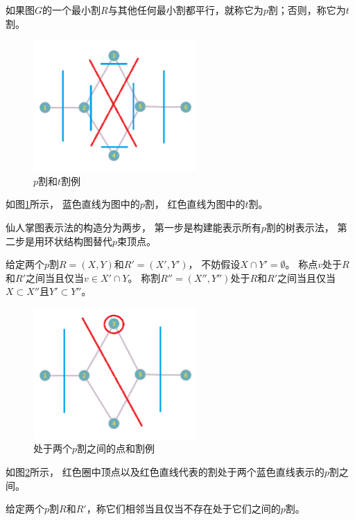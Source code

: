\begin{definition}[$p$割与$t$割]
  如果图$G$的一个最小割$R$与其他任何最小割都平行，就称它为$p$割；否则，称它为$t$割。
\end{definition}
\begin{figure}[htb]
  \centering
    \includegraphics[height=5cm]{figures/graph008.png}
  \caption{$p$割和$t$割例}
  \label{ptcut}
\end{figure}
如图\ref{ptcut}所示，
蓝色直线为图中的$p$割，
红色直线为图中的$t$割。

仙人掌图表示法的构造分为两步，
第一步是构建能表示所有$p$割的树表示法，
第二步是用环状结构图替代$p$束顶点。

\begin{definition}
  给定两个$p$割$R=(X,Y)$和$R'=(X',Y')$，
  不妨假设$X\cap Y'=\emptyset$。
  称点$v$处于$R$和$R'$之间当且仅当$v\in X'\cap Y$。
  称割$R''=(X'',Y'')$处于$R$和$R'$之间当且仅当 $X\subset X''$且$Y'\subset Y''$。
\end{definition}


\begin{figure}[htb]
  \centering
    \includegraphics[height=5cm]{figures/graph009.png}
  \caption{处于两个$p$割之间的点和割例}
  \label{between}
\end{figure}
如图\ref{between}所示，
红色圈中顶点以及红色直线代表的割处于两个蓝色直线表示的$p$割之间。

\begin{definition}[相邻的$p$割]
  给定两个$p$割$R$和$R'$，称它们相邻当且仅当不存在处于它们之间的$p$割。
\end{definition}


